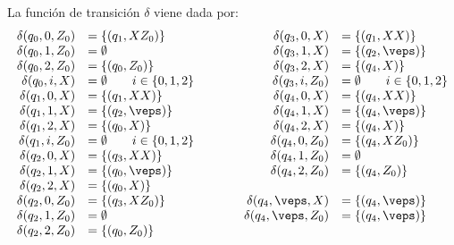 \begin{ejercicio}
\begin{description}
        La función de transición $\delta$ viene dada por:
        \begin{equation*}
            \begin{array}{rlcrl}
                \delta(q_0,0,Z_0) &= \{(q_1,XZ_0)\}
                &\qquad& \delta(q_3,0,X) &= \{(q_1,XX)\} \\
                \delta(q_0,1,Z_0) &= \emptyset
                &\qquad& \delta(q_3,1,X) &= \{(q_2,\veps)\} \\
                \delta(q_0,2,Z_0) &= \{(q_0,Z_0)\}
                &\qquad& \delta(q_3,2,X) &= \{(q_4,X)\} \\
                \delta(q_0,i,X) &= \emptyset \qquad i\in\{0,1,2\} & \qquad & \delta(q_3,i,Z_0) &= \emptyset \qquad i\in\{0,1,2\} \\
                \delta(q_1,0,X) &= \{(q_1,XX)\}
                &\qquad& \delta(q_4,0,X) &= \{(q_4,XX)\} \\
                \delta(q_1,1,X) &= \{(q_2,\veps)\}
                &\qquad& \delta(q_4,1,X) &= \{(q_4,\veps)\} \\
                \delta(q_1,2,X) &= \{(q_0,X)\}
                &\qquad& \delta(q_4,2,X) &= \{(q_4,X)\} \\
                \delta(q_1,i,Z_0) &= \emptyset \qquad i\in\{0,1,2\} & \qquad & \delta(q_4,0,Z_0) &= \{(q_4,XZ_0)\} \\
                \delta(q_2,0,X) &= \{(q_3,XX)\} 
                &\qquad& \delta(q_4,1,Z_0) &= \emptyset \\
                \delta(q_2,1,X) &= \{(q_0,\veps)\}
                &\qquad& \delta(q_4,2,Z_0) &= \{(q_4,Z_0)\} \\
                \delta(q_2,2,X) &= \{(q_0,X)\}
                &\qquad& \\
                \delta(q_2,0,Z_0) &= \{(q_3,XZ_0)\}
                &\qquad&  \delta(q_4,\veps,X) &= \{(q_4,\veps)\}\\
                \delta(q_2,1,Z_0) &= \emptyset
                &\qquad& \delta(q_4,\veps,Z_0) &= \{(q_4,\veps)\}\\
                \delta(q_2,2,Z_0) &= \{(q_0,Z_0)\}
            \end{array}
        \end{equation*}
        \begin{comment}
        \begin{align*}
            &\delta(q_0,0,Z_0) = \{(q_1,XZ_0)\} \\
            &\delta(q_0,1,Z_0) = \emptyset \\

\end{comment}
\end{description}
\end{ejercicio}
